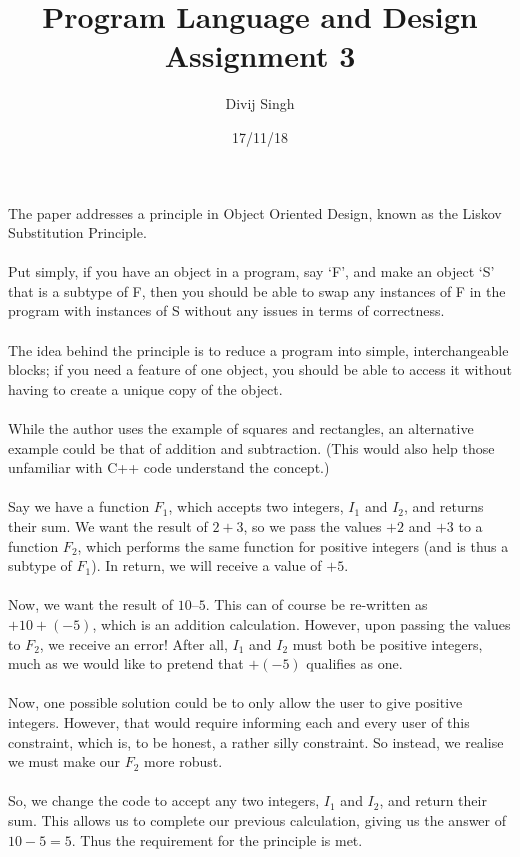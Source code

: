 \documentclass{article}
\title{Program Language and Design Assignment 3}
\author{Divij Singh}
\date{17/11/18}
\begin{document}
	\maketitle
	The paper addresses a principle in Object Oriented Design, known as the Liskov Substitution Principle. \\
\\
Put simply, if you have an object in a program, say ‘F’, and make an object ‘S’ that is a subtype of F, then you should be able to swap any instances of F in the program with instances of S without any issues in terms of correctness. \\
\\
The idea behind the principle is to reduce a program into simple, interchangeable blocks; if you need a feature of one object, you should be able to access it without having to create a unique copy of the object. \\ 
\\
While the author uses the example of squares and rectangles, an alternative example could be that of addition and subtraction. (This would also help those unfamiliar with C++ code understand the concept.) \\
\\
Say we have a function $F_1$, which accepts two integers, $I_1$ and $I_2$, and returns their sum. We want the result of $2+3$, so we pass the values $+2$ and $+3$ to a function $F_2$, which performs the same function for positive integers (and is thus a subtype of $F_1$). In return, we will receive a value of $+5$. \\
\\
Now, we want the result of $10 – 5$. This can of course be re-written as $+10 + (-5)$, which is an addition calculation. However, upon passing the values to $F_2$, we receive an error! After all, $I_1$ and $I_2$ must both be positive integers, much as we would like to pretend that $+ (- 5)$ qualifies as one. \\
\\
Now, one possible solution could be to only allow the user to give positive integers. However, that would require informing each and every user of this constraint, which is, to be honest, a rather silly constraint. So instead, we realise we must make our $F_2$ more robust. \\
\\
So, we change the code to accept any two integers, $I_1$ and $I_2$, and return their sum. This allows us to complete our previous calculation, giving us the answer of $10-5=5$. Thus the requirement for the principle is met. \\
\end{document}
